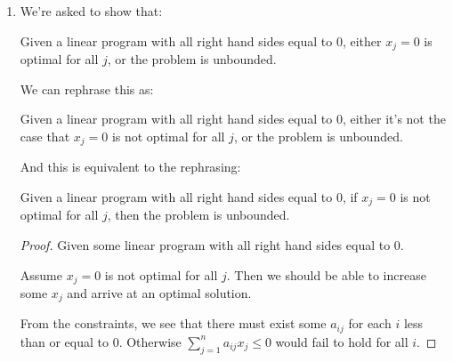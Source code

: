 \documentclass[12pt,letterpaper]{article}
\begin{document}
\begin{enumerate}
\begin{proof}
        Then we know that $\overline{c}_l > 0$.

        We also know that $x_l = \overline{b}_l - \ldots - \overline{c}_{lk}x_k - \ldots$.

        When we go to pivot in the objective function $\zeta$, we substitute this new value for $x_l$.

        We end up with $\zeta = \overline{\zeta} + \ldots + \overline{c}_l\left(\overline{b}_l - \ldots - \overline{c}_{lk}x_k - \ldots\right) + \ldots$.

        After simplification, and letting $\overline{c}_{lk}' = \overline{c}_l\overline{c}_{lk}$, we have

        $\zeta = \overline{\zeta}' + \ldots - \overline{c}_{lk}'x_k + \ldots$

        Since $\overline{c}_{lk}' < 0$, it will not be chosen to become basic in the next iteration.

        Since our choice of entering and leaving variables was arbitrary,
        this holds for any such entering and leaving variables.

        Thus, we have shown that
        if a variable becomes non-basic in one iteration,
        then it cannot become basic in the next iteration.
      \end{proof}
    \item
      We're asked to show that:

      Given a linear program with all right hand sides equal to 0,
      either $x_j = 0$ is optimal for all $j$, or the problem is unbounded.

      We can rephrase this as:

      Given a linear program with all right hand sides equal to 0,
      either it's not the case that $x_j = 0$ is not optimal for all $j$, or the problem is unbounded.

      And this is equivalent to the rephrasing:

      Given a linear program with all right hand sides equal to 0,
      if $x_j = 0$ is not optimal for all $j$, then the problem is unbounded.

      \begin{proof}
        Given some linear program with all right hand sides equal to 0.

        Assume $x_j = 0$ is not optimal for all $j$.
        Then we should be able to increase some $x_j$ and arrive at an optimal solution.

        From the constraints, we see that there must exist some $a_{ij}$ for each $i$ less than or equal to 0.
        Otherwise $\sum\limits_{j = 1}^n a_{ij}x_j \leq 0$ would fail to hold for all $i$.


\end{proof}
\end{enumerate}
\end{document}
